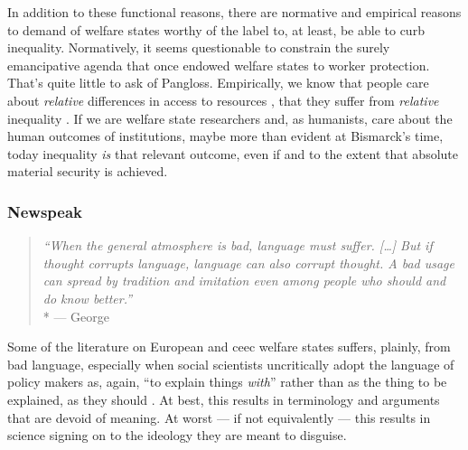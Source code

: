 \begin{enumerate}
	In addition to these functional reasons, there are normative and empirical reasons to demand of welfare states worthy of the label to, at least, be able to curb inequality.
	Normatively, it seems questionable to constrain the surely emancipative agenda that once endowed welfare states to worker protection.
	That's quite little to ask of Pangloss.
	Empirically, we know that people care about \emph{relative} differences in access to resources \citep{Frank2005}, that they suffer from \emph{relative} inequality \citep{Pickett-2009-kx}.
	If we are welfare state researchers and, as humanists, care about the human outcomes of institutions, maybe more than evident at Bismarck's time, today inequality \emph{is} that relevant outcome, even if and to the extent that absolute material security is achieved.
\end{enumerate}

\subsubsection[Newspeak]{Newspeak}
	\label{sec:newspeak}

\begin{quote}
	\emph{``When the general atmosphere is bad, language must suffer.
	[\ldots]
	But if thought corrupts language, language can also corrupt thought.
	A bad usage can spread by tradition and imitation even among people who should and do know better.''}
	\\*
	--- George \citet{Orwell1946}
\end{quote}

Some of the literature on European and \gls{ceec} welfare states suffers, plainly, from bad language, especially when social scientists uncritically adopt the language of policy makers as, again, ``to explain things \emph{with}'' rather than as the thing to be explained, as they should \citep{Brubaker-2002-aa}.
At best, this results in terminology and arguments that are devoid of meaning.
At worst --- if not equivalently --- this results in science signing on to the ideology they are meant to disguise.



